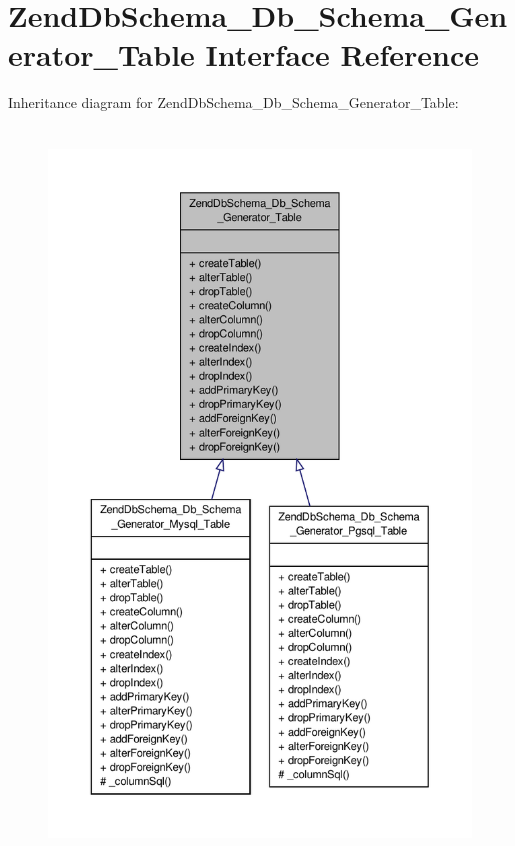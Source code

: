 \hypertarget{interfaceZendDbSchema__Db__Schema__Generator__Table}{\section{Zend\-Db\-Schema\-\_\-\-Db\-\_\-\-Schema\-\_\-\-Generator\-\_\-\-Table Interface Reference}
\label{interfaceZendDbSchema__Db__Schema__Generator__Table}
}


Inheritance diagram for Zend\-Db\-Schema\-\_\-\-Db\-\_\-\-Schema\-\_\-\-Generator\-\_\-\-Table\-:\nopagebreak
\begin{figure}[H]
\begin{center}
\leavevmode
\includegraphics[height=550pt]{interfaceZendDbSchema__Db__Schema__Generator__Table__inherit__graph}
\end{center}
\end{figure}


